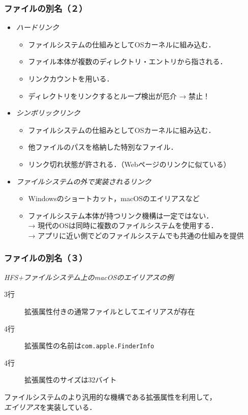\documentclass[unicode,handout]{beamer}                   %
\begin{document}
\begin{frame}
  \frametitle{ファイルの別名（２）}
  \begin{itemize}
  \item \emph{ハードリンク} \\
    \begin{itemize}
    \item ファイルシステムの仕組みとしてOSカーネルに組み込む．
    \item ファイル本体が複数のディレクトリ・エントリから指される．
    \item リンクカウントを用いる．
    \item ディレクトリをリンクするとループ検出が厄介 → 禁止！
    \end{itemize}
  \item \emph{シンボリックリンク} \\
    \begin{itemize}
    \item ファイルシステムの仕組みとしてOSカーネルに組み込む．
    \item 他ファイルのパスを格納した特別なファイル．
    \item リンク切れ状態が許される．（Webページのリンクに似ている）
    \end{itemize}
  \item \emph{ファイルシステムの外で実装されるリンク} \\
    \begin{itemize}
    \item Windowsのショートカット，macOSのエイリアスなど
    \item ファイルシステム本体が持つリンク機構は一定ではない． \\
      → 現代のOSは同時に複数のファイルシステムを使用する．\\
      → アプリに近い側でどのファイルシステムでも共通の仕組みを提供
    \end{itemize}
  \end{itemize}
\end{frame}

\begin{frame}
  \frametitle{ファイルの別名（３）}
  \emph{HFS+ファイルシステム上のmacOSのエイリアスの例}
  \begin{description}
    \item[3行] 拡張属性付きの通常ファイルとしてエイリアスが存在
    \item[4行] 拡張属性の名前は\texttt{com.apple.FinderInfo}
    \item[4行] 拡張属性のサイズは32バイト
  \end{description}
  ファイルシステムのより汎用的な機構である拡張属性を利用して，\\
  \emph{エイリアス}を実装している．
  \vfill
\end{frame}
\end{document}
